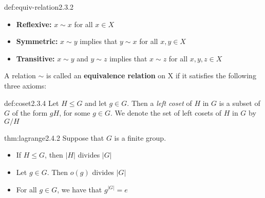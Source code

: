 \documentclass[landscape, 8pt]{extarticle}
\begin{document}
\begin{multicols}{3}
\begin{dfn}{def:equiv-relation}{2.3.2}
    \renewcommand\labelitemi{\tiny$\bullet$}
    \begin{itemize}
        \setlength\itemsep{0em}
        \item \textbf{Reflexive:} $x\sim x$ for all $x\in X$
        \item \textbf{Symmetric:} $x\sim y$ implies that $y\sim x$ for all $x,y\in X$
        \item \textbf{Transitive:} $x\sim y$ and $y\sim z$ implies that $x\sim z$ for all $x,y,z\in X$
    \end{itemize}
    A relation $\sim$ is called an \textbf{equivalence relation} on X if it satisfies the following three axioms:  
\end{dfn}
\vspace{-5pt}

\begin{dfn}[Coset]{def:coset}{2.3.4}
    Let $H\le G$ and let $g\in G$. Then a \textit{left coset} of  $H$ in $G$ is a subset of $G$ of the form $gH$, for some $g\in G$.
    We denote the set of left cosets of $H$ in $G$ by $G/H$
\end{dfn}
\vspace{-5pt}

\begin{thm}{thm:lagrange}{2.4.2}
    Suppose that $G$ is a finite group.
    \renewcommand\labelitemi{\tiny$\bullet$}
    \begin{itemize}
        \setlength\itemsep{0em}
        \item If $H\le G$, then $\lvert  H\rvert $ divides $\lvert G\rvert $
        \item Let $g\in G$. Then $o(g)$ divides $\lvert  G\rvert $
        \item For all $g\in G$, we have that $g^{\lvert G\rvert } = e$
    \end{itemize}
\end{thm}
\vspace{-5pt}

\newpage



\end{multicols}
\end{document}
